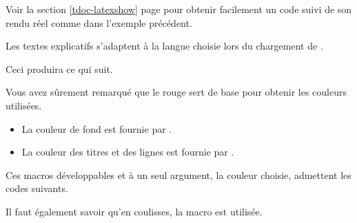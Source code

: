 \begin{tdocrem}
    Voir la section \ref{tdoc-latexshow} page \pageref{tdoc-latexshow} pour obtenir facilement un code suivi de son rendu réel comme dans l'exemple précédent.
\end{tdocrem}


\begin{tdocnote}
    Les textes explicatifs s'adaptent à la langue choisie lors du chargement de \thispack{}.
\end{tdocnote}




\begin{tdocexa}
    \leavevmode



    Ceci produira ce qui suit.

    \medskip

    

\end{tdocexa}


\begin{tdocnote}
    Vous avez sûrement remarqué que le rouge sert de base pour obtenir les couleurs utilisées.
    
    \begin{itemize}
    	\item La couleur de fond est fournie par .

    	\item La couleur des titres et des lignes est fournie par .
    \end{itemize}
    
    Ces macros développables et à un seul argument, la couleur choisie, admettent les codes suivants.

    \begin{tdoclatex}[code]
    \end{tdoclatex}

    Il faut également savoir qu'en coulisses, la macro  est utilisée.
    
    \begin{tdoclatex}[std]
    \end{tdoclatex}
\end{tdocnote}


